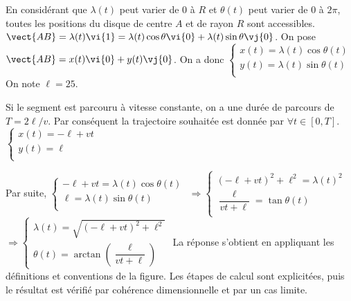 \begin{corrigebox}
En considérant que $\lambda(t)$ peut varier de 0 à $R$ et $\theta(t)$ peut varier de 0 à $2\pi$, toutes les positions du disque de centre $A$ et de rayon $R$ sont accessibles.
$\vect{AB}=\lambda(t) \vi{1} =\lambda(t) \cos \theta \vi{0} +\lambda(t) \sin \theta \vj{0}$.
On pose $\vect{AB} = x(t)\vi{0}+y(t)\vj{0}$. On a donc 
$\left\{
\begin{array}{l}
x(t) = \lambda(t) \cos \theta(t) \\
y(t) = \lambda(t) \sin \theta(t) \\
\end{array}
\right.$
On note $\ell = 25$. 

Si le segment est parcouru à vitesse constante, on a une durée de parcours de $T = 2\ell / v$. 
Par conséquent la trajectoire souhaitée est donnée par $\forall t \in [0,T]$. 
$\left\{
\begin{array}{l}
x(t) = -\ell+vt \\
y(t) = \ell \\
\end{array}
\right.
$

Par suite,
$\left\{
\begin{array}{l}
-\ell+vt  = \lambda(t) \cos \theta(t) \\
\ell = \lambda(t) \sin \theta(t) \\
\end{array}
\right.$ 
$\Rightarrow 
\left\{
\begin{array}{l}
\left(-\ell+vt\right)^2 + \ell^2   = \lambda(t)^2  \\
\dfrac{\ell}{vt+\ell} =  \tan \theta(t) \\
\end{array}
\right.$ 
$\Rightarrow 
\left\{
\begin{array}{l}
\lambda(t) = \sqrt{\left(-\ell+vt\right)^2 + \ell^2}\\
\theta(t) = \arctan \left( \dfrac{\ell}{vt+\ell} \right)
\end{array}
\right.$
La réponse s'obtient en appliquant les définitions et conventions de la
    figure. Les étapes de calcul sont explicitées, puis le résultat est vérifié par
    cohérence dimensionnelle et par un cas limite.
\end{corrigebox}
